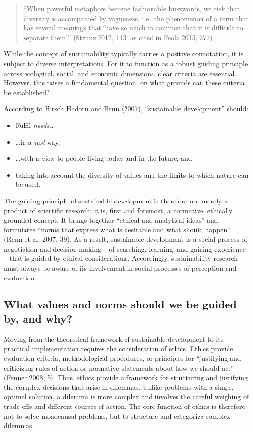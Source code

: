 \documentclass[
  a4paper,
  DIV=11,
  numbers=noendperiod,
  oneside,
  openany]{scrreprt}
\providecommand{\tightlist}{%
  \setlength{\itemsep}{0pt}\setlength{\parskip}{0pt}}
\begin{document}
\begin{quote}
``When powerful metaphors become fashionable buzzwords, we risk that
diversity is accompanied by vagueness, i.e.~the phenomenon of a term
that has several meanings that `have so much in common that it is
difficult to separate them'.'' (Strunz 2012, 113; as cited in Feola
2015, 377)
\end{quote}

While the concept of sustainability typically carries a positive
connotation, it is subject to diverse interpretations. For it to
function as a robust guiding principle across ecological, social, and
economic dimensions, clear criteria are essential. However, this raises
a fundamental question: on what grounds can these criteria be
established?

According to Hirsch Hadorn and Brun (2007), ``sustainable development''
should:

\begin{itemize}
\tightlist
\item
  Fulfil \emph{needs}\ldots{}
\item
  \ldots in a \emph{just} way,
\item
  \ldots with a view to people living today and in the future, and
\item
  taking into account the diversity of values and the limits to which
  nature can be used.
\end{itemize}

The guiding principle of sustainable development is therefore not merely
a product of scientific research; it is, first and foremost, a
normative, ethically grounded concept. It brings together ``ethical and
analytical ideas'' and formulates ``norms that express what is desirable
and what should happen'' (Renn et al. 2007, 39). As a result,
sustainable development is a social process of negotiation and
decision-making -- of searching, learning, and gaining experience --
that is guided by ethical considerations. Accordingly, sustainability
research must always be aware of its involvement in social processes of
perception and evaluation.

\subsection{What values and norms should we be guided by, and
why?}\label{what-values-and-norms-should-we-be-guided-by-and-why}

Moving from the theoretical framework of sustainable development to its
practical implementation requires the consideration of ethics. Ethics
provide evaluation criteria, methodological procedures, or principles
for ``justifying and criticizing rules of action or normative statements
about how we should act'' (Fenner 2008, 5). Thus, ethics provide a
framework for structuring and justifying the complex decisions that
arise in dilemmas. Unlike problems with a single, optimal solution, a
dilemma is more complex and involves the careful weighing of trade-offs
and different courses of action. The core function of ethics is
therefore not to solve monocausal problems, but to structure and
categorize complex dilemmas.
\end{document}
